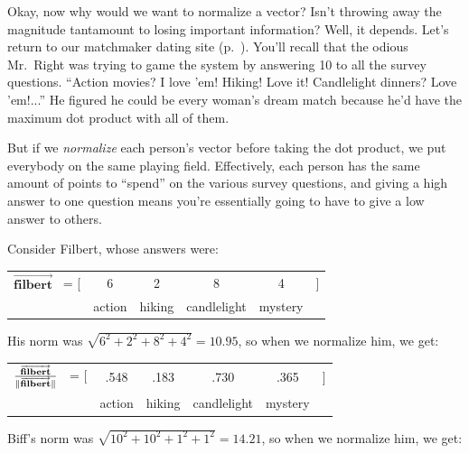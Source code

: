 
Okay, now why would we want to normalize a vector? Isn't throwing away the
magnitude tantamount to losing important information? Well, it depends. Let's
return to our matchmaker dating site (p.~\pageref{matchmakerExample}). You'll
recall that the odious Mr.~Right was trying to game the system by answering 10
to all the survey questions. ``Action movies? I love 'em! Hiking! Love it!
Candlelight dinners? Love 'em!...'' He figured he could be every woman's dream
match because he'd have the maximum dot product with all of them.

But if we \textit{normalize} each person's vector before taking the dot
product, we put everybody on the same playing field. Effectively, each person
has the same amount of points to ``spend'' on the various survey questions, and
giving a high answer to one question means you're essentially going to have to
give a low answer to others.


Consider Filbert, whose answers were:

\begin{center}
\begin{tabular}{cccccc}
$\overrightarrow{\textbf{filbert}}$ \quad \ = [ & 6 & 2 & 8 & 4 & ] \\
& \scriptsize{action} & \scriptsize{hiking} & \scriptsize{candlelight} &
\scriptsize{mystery} & \medskip \\
\end{tabular}
\end{center}
\vspace{-.15in}

His norm was $\sqrt{6^2+2^2+8^2+4^2}=10.95$, so when we normalize him, we get:

\begin{center}
\begin{tabular}{cccccc}
$\frac{\overrightarrow{\textbf{filbert}}}{\lVert\overrightarrow{\textbf{filbert}}\rVert}$
\quad \ = [ & .548 & .183 & .730 & .365 & ] \\
& \scriptsize{action} & \scriptsize{hiking} & \scriptsize{candlelight} &
\scriptsize{mystery} & \medskip \\
\end{tabular}
\end{center}
\vspace{-.15in}

Biff's norm was $\sqrt{10^2+10^2+1^2+1^2}=14.21$, so when we normalize him, we get:

